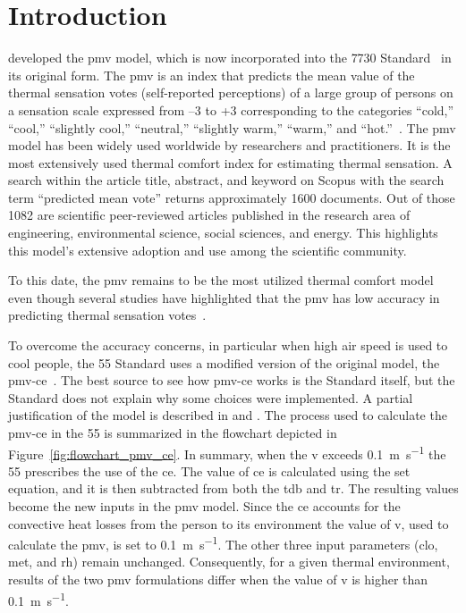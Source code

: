 \section{Introduction}\label{sec:introduction}
 developed the \ac{pmv} model, which is now incorporated into the \gls{7730} Standard~\cite{iso7730} in its original form.
The \ac{pmv} is an index that predicts the mean value of the thermal sensation votes (self-reported perceptions) of a large group of persons on a sensation scale expressed from –3 to +3 corresponding to the categories ``cold,'' ``cool,'' ``slightly cool,'' ``neutral,'' ``slightly warm,'' ``warm,'' and ``hot.''~\cite{iso7730, ashrae552023}.
The \ac{pmv} model has been widely used worldwide by researchers and practitioners.
It is the most extensively used thermal comfort index for estimating thermal sensation.
A search within the article title, abstract, and keyword on Scopus with the search term ``predicted mean vote'' returns approximately \num{1600} documents.
Out of those \num{1082} are scientific peer-reviewed articles published in the research area of engineering, environmental science, social sciences, and energy.
This highlights this model's extensive adoption and use among the scientific community.

To this date, the \ac{pmv} remains to be the most utilized thermal comfort model even though several studies have highlighted that the \ac{pmv} has low accuracy in predicting thermal sensation votes~\cite{Cheung2019, Yao2022, kim2019thermal, tartarini2018thermal, Humphreys2002, doherty_evaluation_1988, tartarini_prediction_2023}.

To overcome the accuracy concerns, in particular when high air speed is used to cool people, the \gls{55} Standard uses a modified version of the original model, the \ac{pmv-ce}~\cite{ashrae552023}.
The best source to see how \ac{pmv-ce} works is the Standard itself, but the Standard does not explain why some choices were implemented.
A partial justification of the model is described in  and .
The process used to calculate the \ac{pmv-ce} in the \gls{55} is summarized in the flowchart depicted in Figure~\ref{fig:flowchart_pmv_ce}.
In summary, when the \ac{v} exceeds \qty{0.1}{\m\per\s} the \gls{55} prescribes the use of the \ac{ce}.
The value of \ac{ce} is calculated using the \ac{set} equation, and it is then subtracted from both the \ac{tdb} and \ac{tr}.
The resulting values become the new inputs in the \ac{pmv} model.
Since the \ac{ce} accounts for the convective heat losses from the person to its environment the value of \ac{v}, used to calculate the \ac{pmv}, is set to \qty{0.1}{\m\per\s}.
The other three input parameters (\ac{clo}, \ac{met}, and \ac{rh}) remain unchanged.
Consequently, for a given thermal environment, results of the two \ac{pmv} formulations differ when the value of \ac{v} is higher than \qty{0.1}{\m\per\s}.

